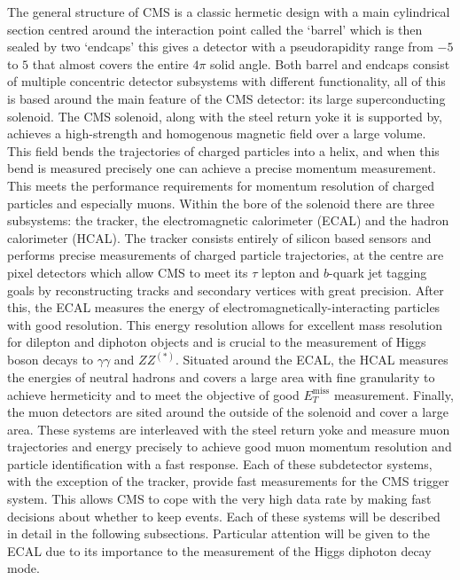 The general structure of CMS is a classic hermetic design with a main cylindrical section centred around the interaction point called the `barrel' which is then sealed by two `endcaps' this gives a detector with a pseudorapidity range from $-5$ to $5$ that almost covers the entire $4\pi$ solid angle. Both barrel and endcaps consist of multiple concentric detector subsystems with different functionality, all of this is based around the main feature of the CMS detector: its large superconducting solenoid. 
The CMS solenoid, along with the steel return yoke it is supported by, achieves a high-strength and homogenous magnetic field over a large volume. This field bends the trajectories of charged particles into a helix, and when this bend is measured precisely one can achieve a precise momentum measurement. This meets the performance requirements for momentum resolution of charged particles and especially muons. Within the bore of the solenoid there are three subsystems: the tracker, the electromagnetic calorimeter (ECAL) and the hadron calorimeter (HCAL). The tracker consists entirely of silicon based sensors and performs precise measurements of charged particle trajectories, at the centre are pixel detectors which allow CMS to meet its $\tau$ lepton and $b$-quark jet tagging goals by reconstructing tracks and secondary vertices with great precision. 
After this, the ECAL measures the energy of electromagnetically-interacting particles with good resolution. This energy resolution allows for excellent mass resolution for dilepton and diphoton objects and is crucial to the measurement of Higgs boson decays to $\gamma\gamma$ and $ZZ^{(*)}$.
Situated around the ECAL, the HCAL measures the energies of neutral hadrons and covers a large area with fine granularity to achieve hermeticity and to meet the objective of good $E_{T}^{\mathrm{miss}}$ measurement.
Finally, the muon detectors are sited around the outside of the solenoid and cover a large area. These systems are interleaved with the steel return yoke and measure muon trajectories and energy precisely to achieve good muon momentum resolution and particle identification with a fast response. 
Each of these subdetector systems, with the exception of the tracker, provide fast measurements for the CMS trigger system. This allows CMS to cope with the very high data rate by making fast decisions about whether to keep events.
Each of these systems will be described in detail in the following subsections. Particular attention will be given to the ECAL due to its importance to the measurement of the Higgs diphoton decay mode. 


